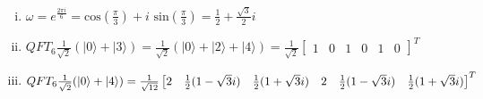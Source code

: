 \documentclass[11pt]{article}
\newenvironment{solution}{\begin{mdframed}[skipabove=\baselineskip,innertopmargin=\baselineskip,innerbottommargin=\baselineskip]
  }{\end{mdframed}}
\begin{document}
\begin{solution}
\begin{enumerate}[(i)]
    \item $\omega = e^{\frac{2\pi i}{6}} = \text{cos}(\frac{\pi}{3}) + i \text{ sin}(\frac{\pi}{3}) = 
    \frac{1}{2}+\frac{\sqrt{3}}{2}i$
    
    \item $QFT_6 \frac{1}{\sqrt{2}}(|0\rangle +|3\rangle) = \frac{1}{\sqrt{2}}(|0\rangle+|2\rangle+|4\rangle) = \frac{1}{\sqrt{2}}\begin{bmatrix} 1 & 0 & 1 & 0 & 1 & 0 \end{bmatrix}^T$ %
    
    \item $QFT_6 \frac{1}{\sqrt{2}}(|0\rangle +|4\rangle)
    \\ = \frac{1}{\sqrt{12}}\begin{bmatrix}2 & \frac{1}{2}(1-\sqrt{3}i) & \frac{1}{2}(1+\sqrt{3}i) & 2 & \frac{1}{2}(1-\sqrt{3}i) & \frac{1}{2}(1+\sqrt{3}i) \end{bmatrix}^T$  
    

\end{enumerate}
\end{solution}
\end{document}
